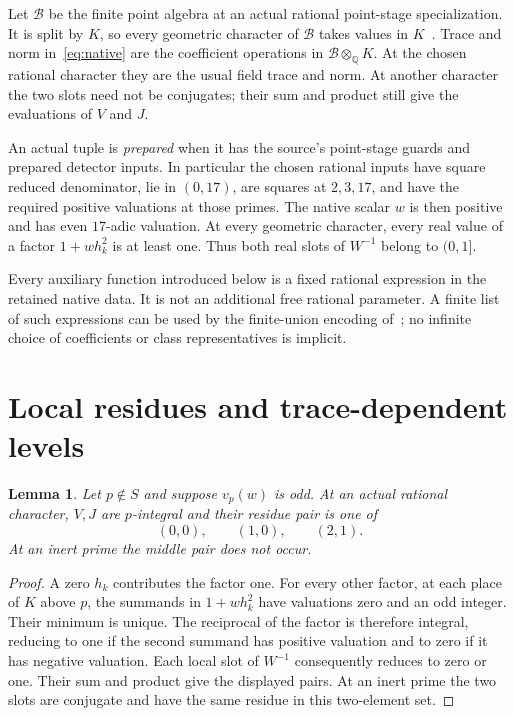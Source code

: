 \documentclass[11pt,a4paper]{article}
\newtheorem{lemma}[theorem]{Lemma}
\theoremstyle{definition}\newtheorem{definition}[theorem]{Definition}
\newcommand{\Q}{\mathbb Q}\newcommand{\Z}{\mathbb Z}
\begin{document}
Let $\mathcal B$ be the finite point algebra at an actual rational
point-stage specialization. It is split by $K$, so every geometric
character of $\mathcal B$ takes values in $K$~\cite[Lemma 1.1]{Complement}.
Trace and norm in~\eqref{eq:native} are the coefficient operations
in $\mathcal B\otimes_\Q K$. At the chosen rational character they
are the usual field trace and norm. At another character the two
slots need not be conjugates; their sum and product still give the
evaluations of $V$ and $J$.

An actual tuple is \emph{prepared} when it has the source's
point-stage guards and prepared detector inputs. In particular the
chosen rational inputs have square reduced denominator, lie in
$(0,17)$, are squares at $2,3,17$, and have the required positive
valuations at those primes. The native scalar $w$ is then positive
and has even $17$-adic valuation. At every geometric character,
every real value of a factor $1+w h_k^2$ is at least one. Thus
both real slots of $W^{-1}$ belong to $(0,1]$.

Every auxiliary function introduced below is a fixed rational
expression in the retained native data. It is not an additional free
rational parameter. A finite list of such expressions can be used
by the finite-union encoding of~\cite{Finite}; no infinite choice of
coefficients or class representatives is implicit.

\section{Local residues and trace-dependent levels}

\begin{lemma}\label{lem:residues}
Let $p\notin S$ and suppose $v_p(w)$ is odd. At an actual rational
character, $V,J$ are $p$-integral and their residue pair is one of
\[
                         (0,0),\qquad(1,0),\qquad(2,1).
\]
At an inert prime the middle pair does not occur.
\end{lemma}
\begin{proof}
A zero $h_k$ contributes the factor one. For every other factor,
at each place of $K$ above $p$, the summands in $1+w h_k^2$
have valuations zero and an odd integer. Their minimum is unique.
The reciprocal of the factor is therefore integral, reducing to
one if the second summand has positive valuation and to zero if it
has negative valuation. Each local slot of $W^{-1}$ consequently
reduces to zero or one. Their sum and product give the displayed
pairs. At an inert prime the two slots are conjugate and have the
same residue in this two-element set.
\end{proof}
\end{document}
